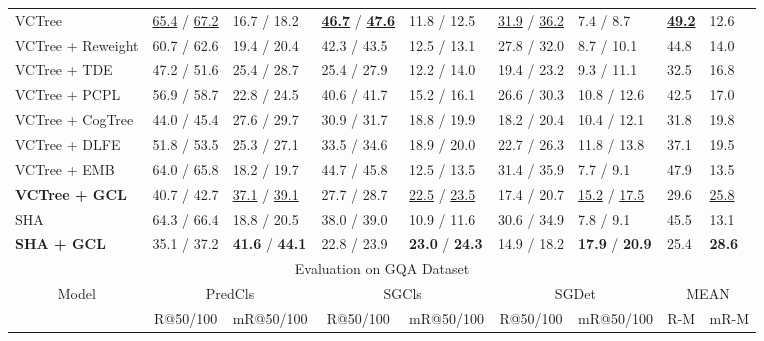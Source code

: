 \documentclass[10pt,twocolumn,letterpaper]{article}
\begin{document}
{\begin{table*}[t]
\begin{tabular}{p{3.2cm}|p{1.4cm}<{\centering}p{1.4cm}<{\centering}|p{1.4cm}<{\centering}p{1.4cm}<{\centering}|p{1.4cm}<{\centering}p{1.4cm}<{\centering}|p{0.5cm}<{\centering}p{0.5cm}}
		VCTree \cite{tang2020unbiased} & \underline{65.4} / \underline{67.2} & 16.7 / 18.2 & \underline{\textbf{46.7}} / \underline{\textbf{47.6}} & 11.8 / 12.5 & \underline{31.9} / \underline{36.2} & 7.4 / 8.7 & \underline{\textbf{49.2}} & 12.6 \\
		VCTree + Reweight \cite{chiou2021recovering} & 60.7 / 62.6 & 19.4 / 20.4 & 42.3 / 43.5 & 12.5 / 13.1 & 27.8 / 32.0 & 8.7 / 10.1 & 44.8 & 14.0 \\
		VCTree + TDE \cite{tang2020unbiased} & 47.2 / 51.6 & 25.4 / 28.7 & 25.4 / 27.9 & 12.2 / 14.0 & 19.4 / 23.2 & 9.3 / 11.1 & 32.5 & 16.8 \\
		VCTree + {PCPL} \cite{chiou2021recovering}  & 56.9 / 58.7 & 22.8 / 24.5 & 40.6 / 41.7 & 15.2 / 16.1 & 26.6 / 30.3 & 10.8 / 12.6 & 42.5 & 17.0 \\
		VCTree + CogTree \cite{yu2020cogtree} &  44.0 / 45.4 & 27.6 / 29.7 & 30.9 / 31.7 & 18.8 / 19.9 & 18.2 / 20.4 & 10.4 / 12.1 & 31.8 & 19.8 \\ 
		VCTree + DLFE \cite{chiou2021recovering} & 51.8 / 53.5 & 25.3 / 27.1 & 33.5 / 34.6 & 18.9 / 20.0 & 22.7 / 26.3 & 11.8 / 13.8 & 37.1 & 19.5 \\
		VCTree + EMB \cite{suhail2021energy} & 64.0 / 65.8 & 18.2 / 19.7 & 44.7 / 45.8 & 12.5 / 13.5 & 31.4 / 35.9 & 7.7 / 9.1 & 47.9 & 13.5 \\ 
		\textbf{VCTree + GCL} & 40.7 / 42.7 & \underline{37.1} / \underline{39.1} & 27.7 / 28.7 & \underline{22.5} / \underline{23.5} & 17.4 / 20.7 & \underline{15.2} / \underline{17.5} & 29.6 & \underline{25.8} \\\hline
		
		SHA & 64.3 / 66.4 & 18.8 / 20.5 & 38.0 / 39.0 & 10.9 / 11.6 & 30.6 / 34.9 & 7.8 / 9.1 & 45.5 & 13.1 \\
		\textbf{SHA + GCL} & 35.1 / 37.2  & \textbf{41.6} / \textbf{44.1}  & 22.8 / 23.9 & \textbf{23.0} / \textbf{24.3} & 14.9 / 18.2 & \textbf{17.9} / \textbf{20.9} & 25.4 & \textbf{28.6} \\\hline
		
		
	    
		 
		\multicolumn{9}{c}{\multirow{2}{*}{Evaluation on GQA Dataset}}\\
		\multicolumn{9}{c}{}\\
		 
		\hline
		\multicolumn{1}{c|}{\multirow{2}{*}{Model}} & \multicolumn{2}{c|}{PredCls}& \multicolumn{2}{c|}{SGCls}& \multicolumn{2}{c|}{SGDet}& \multicolumn{2}{c}{MEAN}\\ \cline{2-9} 
		\multicolumn{1}{c|}{}& \multicolumn{1}{c}{R@50/100} & \multicolumn{1}{c|}{mR@50/100} & \multicolumn{1}{c}{R@50/100} & \multicolumn{1}{c|}{mR@50/100} & \multicolumn{1}{c}{R@50/100} & \multicolumn{1}{c|}{mR@50/100} & \multicolumn{1}{c}{R-M} & \multicolumn{1}{c}{mR-M}\\ \hline
		

\end{tabular}
\end{table*}}
\end{document}
